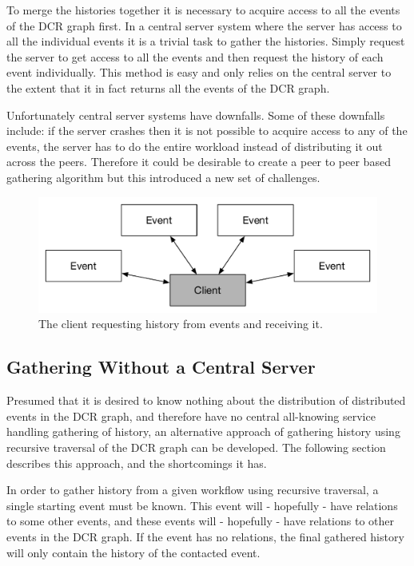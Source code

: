     To merge the histories together it is necessary to acquire access to all the events of the DCR graph first. In a central server system where the server has access to all the individual events it is a trivial task to gather the histories. Simply request the server to get access to all the events and then request the history of each event individually. This method is easy and only relies on the central server to the extent that it in fact returns all the events of the DCR graph. 
    
    Unfortunately central server systems have downfalls. Some of these downfalls include: if the server crashes then it is not possible to acquire access to any of the events, the server has to do the entire workload instead of distributing it out across the peers. Therefore it could be desirable to create a peer to peer based gathering algorithm but this introduced a new set of challenges.
    
    \begin{figure}[H]
		\centering
		\includegraphics[height=\textheight/6]{4connect/images/server-contacts-events.pdf}
		\caption{The client requesting history from events and receiving it.}
		\label{fig:connecting:server-contacts-events}
	\end{figure}
    
    \subsection{Gathering Without a Central Server}
	Presumed that it is desired to know nothing about the distribution of distributed events in the DCR graph, and therefore have no central all-knowing service handling gathering of history, an alternative approach of gathering history using recursive traversal of the DCR graph can be developed. The following section describes this approach, and the shortcomings it has.   
	
	In order to gather history from a given workflow using recursive traversal, a single starting event must be known. This event will - hopefully - have relations to some other events, and these events will - hopefully - have relations to other events in the DCR graph.
	If the event has no relations, the final gathered history will only contain the history of the contacted event. 
	
